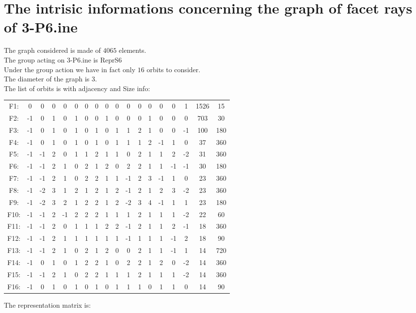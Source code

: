 \documentclass[12pt]{article}
\begin{document}
\section{The intrisic informations concerning the graph of facet rays of 3-P6.ine}
The graph considered is made of $4065$ elements.\\
The group acting on 3-P6.ine is ReprS6\\
Under the group action we have in fact only $16$ orbits to consider.\\
The diameter of the graph is $3$.\\
The list of orbits is with adjacency and Size info:
\begin{center}
\scriptsize
\begin{tabular}{cccccccccccccccc|c|c}
F1:&0&0&0&0&0&0&0&0&0&0&0&0&0&0&1&1526&15\\
F2:&-1&0&1&0&1&0&0&1&0&0&0&1&0&0&0&703&30\\
F3:&-1&0&1&0&1&0&1&0&1&1&2&1&0&0&-1&100&180\\
F4:&-1&0&1&0&1&0&1&0&1&1&1&2&-1&1&0&37&360\\
F5:&-1&-1&2&0&1&1&2&1&1&0&2&1&1&2&-2&31&360\\
F6:&-1&-1&2&1&0&2&1&2&0&2&2&1&1&-1&-1&30&180\\
F7:&-1&-1&2&1&0&2&2&1&1&-1&2&3&-1&1&0&23&360\\
F8:&-1&-2&3&1&2&1&2&1&2&-1&2&1&2&3&-2&23&360\\
F9:&-1&-2&3&2&1&2&2&1&2&-2&3&4&-1&1&1&23&180\\
F10:&-1&-1&2&-1&2&2&2&1&1&1&2&1&1&1&-2&22&60\\
F11:&-1&-1&2&0&1&1&1&2&2&-1&2&1&1&2&-1&18&360\\
F12:&-1&-1&2&1&1&1&1&1&1&-1&1&1&1&-1&2&18&90\\
F13:&-1&-1&2&1&0&2&1&2&0&0&2&1&1&-1&1&14&720\\
F14:&-1&0&1&0&1&2&2&1&0&2&2&1&2&0&-2&14&360\\
F15:&-1&-1&2&1&0&2&2&1&1&1&2&1&1&1&-2&14&360\\
F16:&-1&0&1&0&1&0&1&0&1&1&1&0&1&1&0&14&90\\
\end{tabular}
\end{center}
The representation matrix is:
\end{document}
